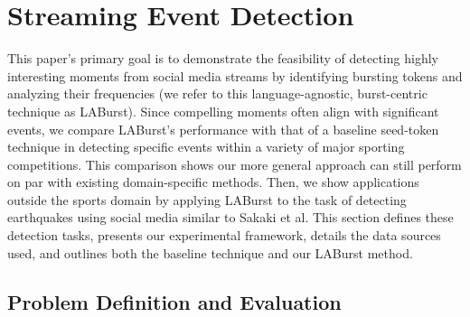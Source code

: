 \documentclass{sig-alternate}
\begin{document}
\section{Streaming Event Detection}
\label{sect:methods}

This paper's primary goal is to demonstrate the feasibility of detecting highly interesting moments from social media streams by identifying bursting tokens and analyzing their frequencies (we refer to this language-agnostic, burst-centric technique as LABurst).
Since compelling moments often align with significant events, we compare LABurst's performance with that of a baseline seed-token technique in detecting specific events within a variety of major sporting competitions.
This comparison shows our more general approach can still perform on par with existing domain-specific methods.
Then, we show applications outside the sports domain by applying LABurst to the task of detecting earthquakes using social media similar to Sakaki et al.
This section defines these detection tasks, presents our experimental framework, details the data sources used, and outlines both the baseline technique and our LABurst method.

\subsection{Problem Definition and Evaluation}
\end{document}
